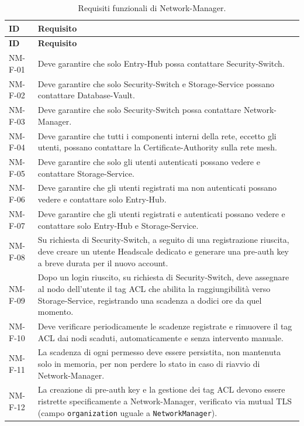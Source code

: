 \begin{longtable}{p{2.6cm} p{\dimexpr\linewidth-2.6cm-4\tabcolsep\relax}}
\caption{Requisiti funzionali di Network-Manager.} \\
\hline
\textbf{ID} & \textbf{Requisito} \\
\hline
\endfirsthead
\hline
\textbf{ID} & \textbf{Requisito} \\
\hline
\endhead
\hline
\endfoot
\hline
\endlastfoot
NM-F-01 & Deve garantire che solo Entry-Hub possa contattare Security-Switch. \\
NM-F-02 & Deve garantire che solo Security-Switch e Storage-Service possano contattare Database-Vault. \\
NM-F-03 & Deve garantire che solo Security-Switch possa contattare Network-Manager. \\
NM-F-04 & Deve garantire che tutti i componenti interni della rete, eccetto gli utenti, possano contattare la Certificate-Authority sulla rete mesh. \\
NM-F-05 & Deve garantire che solo gli utenti autenticati possano vedere e contattare Storage-Service. \\
NM-F-06 & Deve garantire che gli utenti registrati ma non autenticati possano vedere e contattare solo Entry-Hub. \\
NM-F-07 & Deve garantire che gli utenti registrati e autenticati possano vedere e contattare solo Entry-Hub e Storage-Service. \\
NM-F-08 & Su richiesta di Security-Switch, a seguito di una registrazione riuscita, deve creare un utente Headscale dedicato e generare una pre-auth key a breve durata per il nuovo account. \\
NM-F-09 & Dopo un login riuscito, su richiesta di Security-Switch, deve assegnare al nodo dell'utente il tag ACL che abilita la raggiungibilità verso Storage-Service, registrando una scadenza a dodici ore da quel momento. \\
NM-F-10 & Deve verificare periodicamente le scadenze registrate e rimuovere il tag ACL dai nodi scaduti, automaticamente e senza intervento manuale. \\
NM-F-11 & La scadenza di ogni permesso deve essere persistita, non mantenuta solo in memoria, per non perdere lo stato in caso di riavvio di Network-Manager. \\
NM-F-12 & La creazione di pre-auth key e la gestione dei tag ACL devono essere ristrette specificamente a Network-Manager, verificato via mutual TLS (campo \texttt{organization} uguale a \texttt{NetworkManager}). \\

\end{longtable}
